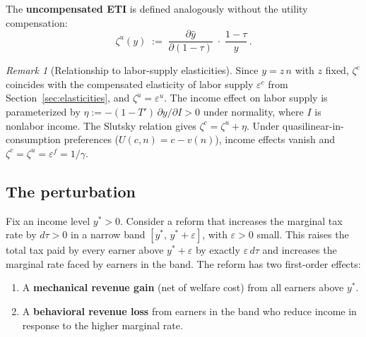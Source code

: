 \documentclass[12pt,a4paper]{article}
\theoremstyle{definition}
\theoremstyle{plain}
\theoremstyle{remark}
\newtheorem{remark}{Remark}[section]
\begin{document}
The \textbf{uncompensated ETI} is defined analogously without
the utility compensation:
\[
  \zeta^u(y)
  \;:=\;
  \frac{\partial \hat{y}}{\partial (1-\tau)}
  \;\cdot\;
  \frac{1-\tau}{y}\,.
\]

\begin{remark}[Relationship to labor-supply elasticities]
Since $y=z\,n$ with $z$ fixed, $\zeta^c$ coincides with the
compensated elasticity of labor supply $\varepsilon^c$ from
Section~\ref{sec:elasticities}, and $\zeta^u = \varepsilon^u$.
The income effect on labor supply is parameterized by
$\eta := -(1-T')\,\partial y/\partial I > 0$ under normality,
where $I$ is nonlabor income. The Slutsky relation gives
$\zeta^c = \zeta^u + \eta$.
Under quasilinear-in-consumption preferences ($U(c,n)=c-v(n)$),
income effects vanish and
$\zeta^c=\zeta^u=\varepsilon^f=1/\gamma$.
\end{remark}

\subsection{The perturbation}
\label{sec:perturb-setup}

Fix an income level $y^*>0$.  Consider a reform that increases
the marginal tax rate by $d\tau>0$ in a narrow band
$[y^*,\,y^*+\varepsilon]$, with $\varepsilon>0$ small.
This raises the total tax paid by every earner above
$y^*+\varepsilon$ by exactly $\varepsilon\,d\tau$ and increases
the marginal rate faced by earners in the band. The reform
has two first-order effects:

\begin{enumerate}
\item A \textbf{mechanical revenue gain} (net of welfare cost)
  from all earners above $y^*$.
\item A \textbf{behavioral revenue loss} from earners in the
  band who reduce income in response to the higher marginal rate.
\end{enumerate}
\end{document}
